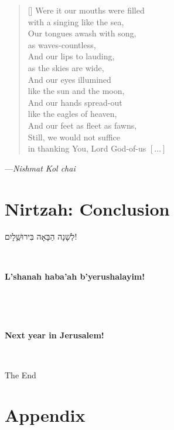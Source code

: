 \documentclass[extrafontsizes,twoside,17pt,a4paper,openany]{memoir}
\newcommand{\HgSource}[1]{\hfill{\small---\itshape{#1}}}
\newcommand{\HgEllipsis}{\ensuremath{\left[\ldots\right]}}
\newcommand{\HgHL}[1]{{\large\textbf{#1}\par\noindent\\[-.5em]}}
\newcommand{\ch}{ch}
\newenvironment{HgHebrew}{\begin{hebrew}\noindent\large}{\end{hebrew}}
\newenvironment{HgEnglish}{\strut\\\noindent}{\vspace{1em}}
\newenvironment{HgTranslit}{\strut\\\noindent\begin{itshape}}{\end{itshape}\vspace{1em}}
\begin{document}
\settowidth{\versewidth}{in thanking You, Lord God-of-us}
\begin{verse}[\versewidth]
Were it our mouths were filled \\
\vin with a singing like the sea, \\
Our tongues awash with song, \\
\vin as waves-countless, \\
And our lips to lauding, \\
\vin as the skies are wide, \\
And our eyes illumined \\
\vin like the sun and the moon, \\
And our hands spread-out \\
\vin like the eagles of heaven, \\
And our feet as fleet as fawns, \\
Still, we would not suffice \\
\vin in thanking You, Lord God-of-us
\HgEllipsis 
\end{verse}
\HgSource{Nishmat Kol {\ch}ai}

\newpage
\chapter{Nirtzah: Conclusion}

\vfill

\begin{HgHebrew}
  לְשָׁנָה הַבָּאָה בִּירוּשַָׁלָיִם!
  \vspace{-1em}
\end{HgHebrew}

\begin{HgTranslit}
  \HgHL{L'shanah haba'ah b'yerushalayim!}
  \vspace{-3em}
\end{HgTranslit}

\begin{HgEnglish}
  \HgHL{Next year in Jerusalem!}
\end{HgEnglish}

\vfill
\begin{center}
  The End
\end{center}
\newpage

\appendix

\thispagestyle{empty}
\chapter{Appendix}
\vspace*{-1cm}
\end{document}
